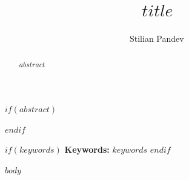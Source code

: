 \documentclass[aps,prd,preprint,nofootinbib,superscriptaddress]{revtex4-2}
\begin{document}
\title{$title$}

\author{Stilian Pandev\,}

$if(abstract)$
\begin{abstract}
$abstract$
\end{abstract}
$endif$

\maketitle

$if(keywords)$
\noindent\textbf{Keywords:} $keywords$
\vspace{6pt}
$endif$

$body$



\end{document}
